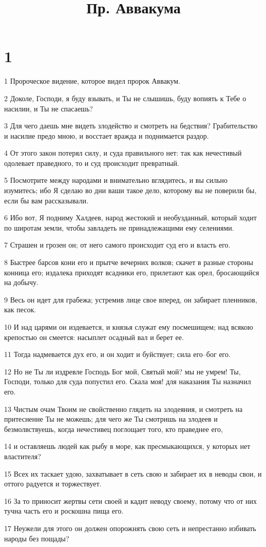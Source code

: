 

\title{Пр. Аввакума}


\chapter{1}

\par 1 Пророческое видение, которое видел пророк Аввакум.
\par 2 Доколе, Господи, я буду взывать, и Ты не слышишь, буду вопиять к Тебе о насилии, и Ты не спасаешь?
\par 3 Для чего даешь мне видеть злодейство и смотреть на бедствия? Грабительство и насилие предо мною, и восстает вражда и поднимается раздор.
\par 4 От этого закон потерял силу, и суда правильного нет: так как нечестивый одолевает праведного, то и суд происходит превратный.
\par 5 Посмотрите между народами и внимательно вглядитесь, и вы сильно изумитесь; ибо Я сделаю во дни ваши такое дело, которому вы не поверили бы, если бы вам рассказывали.
\par 6 Ибо вот, Я подниму Халдеев, народ жестокий и необузданный, который ходит по широтам земли, чтобы завладеть не принадлежащими ему селениями.
\par 7 Страшен и грозен он; от него самого происходит суд его и власть его.
\par 8 Быстрее барсов кони его и прытче вечерних волков; скачет в разные стороны конница его; издалека приходят всадники его, прилетают как орел, бросающийся на добычу.
\par 9 Весь он идет для грабежа; устремив лице свое вперед, он забирает пленников, как песок.
\par 10 И над царями он издевается, и князья служат ему посмешищем; над всякою крепостью он смеется: насыплет осадный вал и берет ее.
\par 11 Тогда надмевается дух его, и он ходит и буйствует; сила его--бог его.
\par 12 Но не Ты ли издревле Господь Бог мой, Святый мой? мы не умрем! Ты, Господи, только для суда попустил его. Скала моя! для наказания Ты назначил его.
\par 13 Чистым очам Твоим не свойственно глядеть на злодеяния, и смотреть на притеснение Ты не можешь; для чего же Ты смотришь на злодеев и безмолвствуешь, когда нечестивец поглощает того, кто праведнее его,
\par 14 и оставляешь людей как рыбу в море, как пресмыкающихся, у которых нет властителя?
\par 15 Всех их таскает удою, захватывает в сеть свою и забирает их в неводы свои, и оттого радуется и торжествует.
\par 16 За то приносит жертвы сети своей и кадит неводу своему, потому что от них тучна часть его и роскошна пища его.
\par 17 Неужели для этого он должен опорожнять свою сеть и непрестанно избивать народы без пощады?


